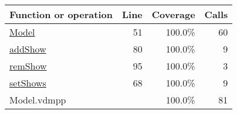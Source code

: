 \bigskip
\begin{longtable}{|l|r|r|r|}
\hline
Function or operation & Line & Coverage & Calls \\
\hline
\hline
\hyperref[Model:51]{Model} & 51&100.0\% & 60 \\
\hline
\hyperref[addShow:80]{addShow} & 80&100.0\% & 9 \\
\hline
\hyperref[remShow:95]{remShow} & 95&100.0\% & 3 \\
\hline
\hyperref[setShows:68]{setShows} & 68&100.0\% & 9 \\
\hline
\hline
Model.vdmpp & & 100.0\% & 81 \\
\hline
\end{longtable}

